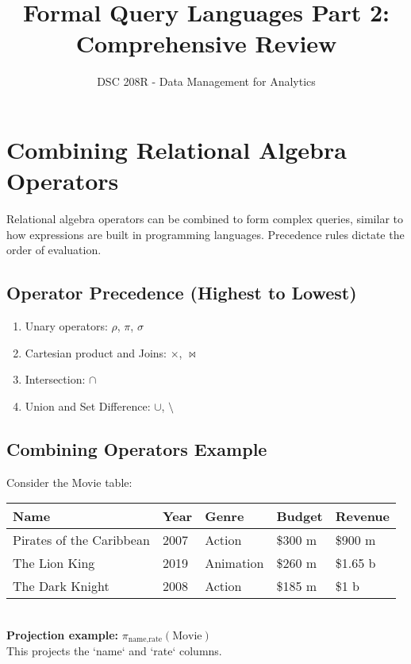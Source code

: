 \documentclass{article}
\title{Formal Query Languages Part 2: Comprehensive Review}
\author{DSC 208R - Data Management for Analytics}
\date{}
\newcommand{\sel}{\sigma} %
\newcommand{\proj}{\pi} %
\newcommand{\ren}{\rho} %
\newcommand{\join}{\bowtie} %
\newcommand{\union}{\cup} %
\newcommand{\intersect}{\cap} %
\begin{document}
\maketitle

\section*{Combining Relational Algebra Operators}
Relational algebra operators can be combined to form complex queries, similar to how expressions are built in programming languages. Precedence rules dictate the order of evaluation. 

\subsection*{Operator Precedence (Highest to Lowest)} 
\begin{enumerate}
    \item Unary operators: $\ren$, $\proj$, $\sel$ 
    \item Cartesian product and Joins: $\times$, $\join$ 
    \item Intersection: $\intersect$ 
    \item Union and Set Difference: $\union$, $\setminus$ 
\end{enumerate}

\subsection*{Combining Operators Example}

Consider the Movie table: \\

\begin{tabular}{|l|l|l|l|l|}
    \hline
    \textbf{Name} & \textbf{Year} & \textbf{Genre} & \textbf{Budget} & \textbf{Revenue} \\
    \hline
    Pirates of the Caribbean & 2007 & Action & \$300 m & \$900 m \\
    The Lion King & 2019 & Animation & \$260 m & \$1.65 b \\
    The Dark Knight & 2008 & Action & \$185 m & \$1 b \\
    \hline
\end{tabular}\\

\textbf{Projection example:} $\proj_{\text{name,rate}}(\text{Movie})$ \\

This projects the `name` and `rate` columns. \\
\end{document}
